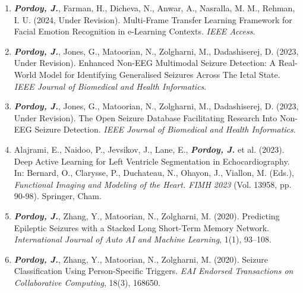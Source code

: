 


\begin{cvparagraph}

\begin{enumerate}

\item \textbf{\textit{Pordoy, J.}}, Farman, H., Dicheva, N., Anwar, A., Nasralla, M. M., Rehman, I. U. (2024, Under Revision). Multi-Frame Transfer Learning Framework for Facial Emotion Recognition in e-Learning Contexts. \emph{IEEE Access}.


\item \textbf{\textit{Pordoy, J.}}, Jones, G., Matoorian, N., Zolgharni, M., Dadashiserej, D. (2023, Under Revision). Enhanced Non-EEG Multimodal Seizure Detection: A Real-World Model for Identifying Generalised Seizures Across The Ictal State. \emph{IEEE Journal of Biomedical and Health Informatics}.

\item \textbf{\textit{Pordoy, J.}}, Jones, G., Matoorian, N., Zolgharni, M., Dadashiserej, D. (2023, Under Revision). The Open Seizure Database Facilitating Research Into Non-EEG Seizure Detection. \emph{IEEE Journal of Biomedical and Health Informatics}.

\item Alajrami, E., Naidoo, P., Jevsikov, J., Lane, E., \textbf{\textit{Pordoy, J.}} et al. (2023). Deep Active Learning for Left Ventricle Segmentation in Echocardiography. In: Bernard, O., Clarysse, P., Duchateau, N., Ohayon, J., Viallon, M. (Eds.), \emph{Functional Imaging and Modeling of the Heart. FIMH 2023} (Vol. 13958, pp. 90-98). Springer, Cham.

\item \textbf{\textit{Pordoy, J.}}, Zhang, Y., Matoorian, N., Zolgharni, M. (2020). Predicting Epileptic Seizures with a Stacked Long Short-Term Memory Network. \emph{International Journal of Auto AI and Machine Learning}, 1(1), 93–108.

\item \textbf{\textit{Pordoy, J.}}, Zhang, Y., Matoorian, N., Zolgharni, M. (2020). Seizure Classification Using Person-Specific Triggers. \emph{EAI Endorsed Transactions on Collaborative Computing}, 18(3), 168650.

\end{enumerate}

\end{cvparagraph}

